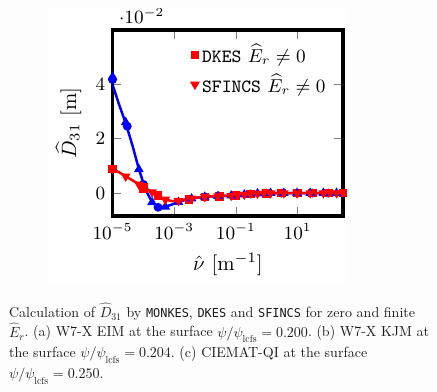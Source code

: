\documentclass[10pt]{iopart}
\begin{document}
\begin{figure}[h]
\begin{subfigure}[t]{0.32\textwidth}
%		
		\caption{}
		\label{subfig:D31_Benchmark_W7X_KJM}
	\end{subfigure}
	\begin{subfigure}[t]{0.32\textwidth}		
		\includegraphics{Benchmark-CIEMAT-QI-s0250-D31}
%		
		\caption{}
		\label{subfig:D31_Benchmark_CIEMAT_QI}
	\end{subfigure}
	\caption{Calculation of $\widehat{D}_{31}$ by \texttt{MONKES}, \texttt{DKES} and \texttt{SFINCS} for zero and finite $\widehat{E}_r$. (a) W7-X EIM at the surface $\psi /\psi_{\text{lcfs}}=0.200$. (b) W7-X KJM at the surface $\psi /\psi_{\text{lcfs}}=0.204$. (c) CIEMAT-QI at the surface $\psi /\psi_{\text{lcfs}}=0.250$. }
	\label{fig:D31_Benchmark}
\end{figure}
\end{document}
